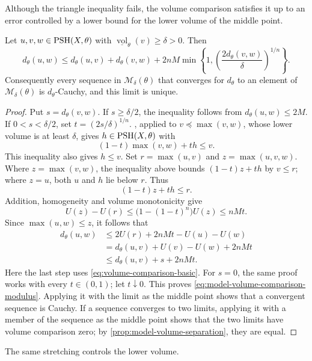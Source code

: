 Although the triangle inequality fails, the volume comparison satisfies it up to an error controlled by a lower bound for the lower volume of the middle point.

\begin{proposition}\label{prop:model-volume-comparison-modulus}
Let $u,v,w\in\mathrm{PSH}(X,\theta)$ with $\underline{\operatorname{vol}}_\theta(v)\geq\delta>0$. Then
\begin{equation}\label{eq:model-volume-comparison-modulus}
 d_\theta(u,w)\leq d_\theta(u,v)+d_\theta(v,w)
 +2nM\min\left\{1,
       \left(\frac{2d_\theta(v,w)}\delta\right)^{1/n}\right\}.
\end{equation}
Consequently every sequence in $\mathcal M_\delta(\theta)$ that converges for $d_\theta$ to an element of $\mathcal M_\delta(\theta)$ is $d_\theta$-Cauchy, and this limit is unique.
\end{proposition}
\begin{proof}
Put $s=d_\theta(v,w)$. If $s\geq\delta/2$, the inequality follows from $d_\theta(u,w)\leq2M$. If $0<s<\delta/2$, set $t=(2s/\delta)^{1/n}$. , applied to $v\preceq\max(v,w)$, whose lower volume is at least $\delta$, gives $h\in\mathrm{PSH}(X,\theta)$ with
\[
 (1-t)\max(v,w)+th\leq v.
\]
This inequality also gives $h\leq v$. Set $r=\max(u,v)$ and $z=\max(u,v,w)$. Where $z=\max(v,w)$, the inequality above bounds $(1-t)z+th$ by $v\leq r$; where $z=u$, both $u$ and $h$ lie below $r$. Thus
\[
 (1-t)z+th\leq r.
\]
Addition, homogeneity and volume monotonicity give
\[
 U(z)-U(r)\leq\bigl(1-(1-t)^n\bigr)U(z)\leq nMt.
\]
Since $\max(u,w)\leq z$, it follows that
\[
 \begin{split}
 d_\theta(u,w)
 &\leq2U(r)+2nMt-U(u)-U(w)\\
 &=d_\theta(u,v)+U(v)-U(w)+2nMt\\
 &\leq d_\theta(u,v)+s+2nMt.
 \end{split}
\]
Here the last step uses \eqref{eq:volume-comparison-basic}. For $s=0$, the same proof works with every $t\in(0,1)$; let $t\downarrow0$. This proves \eqref{eq:model-volume-comparison-modulus}. Applying it with the limit as the middle point shows that a convergent sequence is Cauchy. If a sequence converges to two limits, applying it with a member of the sequence as the middle point shows that the two limits have volume comparison zero; by \cref{prop:model-volume-separation}, they are equal.
\end{proof}

The same stretching controls the lower volume.

